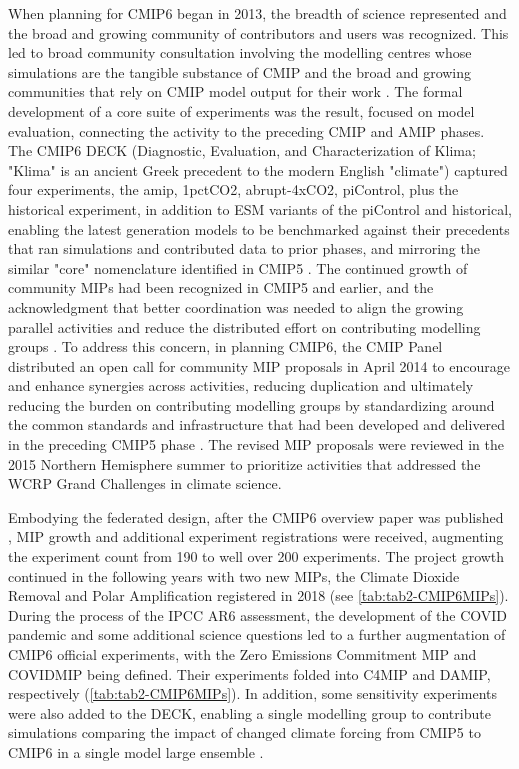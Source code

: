 \documentclass[gmd, preprint]{copernicus}
\begin{document}
When planning for CMIP6 began in 2013, the breadth of science represented and the broad and growing community of contributors and users was recognized. This led to broad community consultation involving the modelling centres whose simulations are the tangible substance of CMIP and the broad and growing communities that rely on CMIP model output for their work \citep{eyring_overview_2016}. The formal development of a core suite of experiments was the result, focused on model evaluation, connecting the activity to the preceding CMIP and AMIP phases. The CMIP6 DECK (Diagnostic, Evaluation, and Characterization of Klima; "Klima" is an ancient Greek precedent to the modern English "climate") captured four experiments, the amip, 1pctCO2, abrupt-4xCO2, piControl, plus the historical experiment, in addition to ESM variants of the piControl and historical, enabling the latest generation models to be benchmarked against their precedents that ran simulations and contributed data to prior phases, and mirroring the similar "core" nomenclature identified in CMIP5 \citep{stouffer_cmip5_2011}. The continued growth of community MIPs had been recognized in CMIP5 and earlier, and the acknowledgment that better coordination was needed to align the growing parallel activities and reduce the distributed effort on contributing modelling groups \citep{eyring_overview_2016}. To address this concern, in planning CMIP6, the CMIP Panel distributed an open call for community MIP proposals in April 2014 to encourage and enhance synergies across activities, reducing duplication and ultimately reducing the burden on contributing modelling groups by standardizing around the common standards and infrastructure that had been developed and delivered in the preceding CMIP5 phase \citep{eyring_overview_2016}. The revised MIP proposals were reviewed in the 2015 Northern Hemisphere summer to prioritize activities that addressed the WCRP Grand Challenges in climate science.

Embodying the federated design, after the CMIP6 overview paper was published \citet{eyring_overview_2016}, MIP growth and additional experiment registrations were received, augmenting the experiment count from 190 to well over 200 experiments. The project growth continued in the following years with two new MIPs, the Climate Dioxide Removal \citep[CDRMIP;][]{keller_carbon_2018} and Polar Amplification \citep[PAMIP;][]{smith_polar_2019} registered in 2018 (see \autoref{tab:tab2-CMIP6MIPs}). During the process of the IPCC AR6 assessment, the development of the COVID pandemic and some additional science questions led to a further augmentation of CMIP6 official experiments, with the Zero Emissions Commitment MIP \citep[ZECMIP;][]{jones_zero_2019} and COVIDMIP \citep{lamboll_modifying_2021} being defined. Their experiments folded into C4MIP and DAMIP, respectively (\autoref{tab:tab2-CMIP6MIPs}). In addition, some sensitivity experiments were also added to the DECK, enabling a single modelling group to contribute simulations comparing the impact of changed climate forcing from CMIP5 to CMIP6 in a single model large ensemble \citep{fyfe_significant_2021}.
\end{document}
